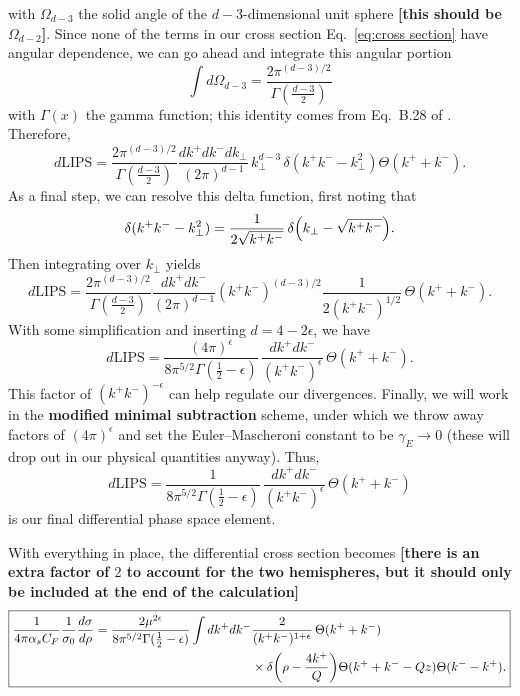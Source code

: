 \documentclass[11pt,twoside,reqno]{amsart}
\theoremstyle{plain}
\theoremstyle{remark}
\theoremstyle{definition}
\theoremstyle{remark}
\theoremstyle{definition}
\theoremstyle{definition}
\newcommand{\LIPS}{\mathrm{LIPS}}
\begin{document}
	with $\Omega_{d - 3}$ the solid angle of the $d - 3$-dimensional unit sphere {\color{red}\textbf{[this should be $\Omega_{d-2}$]}}. Since none of the terms in our cross section Eq.\ \ref{eq:cross section} have angular dependence, we can go ahead and integrate this angular portion
	\begin{equation}
		\int d\Omega_{d - 3} = \frac{2\pi^{(d - 3)/2}}{\Gamma(\frac{d - 3}{2})}
	\end{equation}
	with $\Gamma(x)$ the gamma function; this identity comes from Eq.\ B.28 of \cite{schwartz_quantum_2014}. Therefore,
	\begin{equation}
		d\LIPS = \frac{2\pi^{(d - 3)/2}}{\Gamma(\frac{d - 3}{2})} \frac{dk^+ dk^- dk_\perp}{(2 \pi)^{d - 1}}\,k_\perp^{d - 3}\, \delta(k^+ k^- - k_\perp^2) \Theta(k^+ + k^-).
	\end{equation}
	As a final step, we can resolve this delta function, first noting that
	\begin{equation}
		\delta(k^+ k^- - k_\perp^2) = \frac{1}{2\sqrt{k^+ k^-}}\,\delta\qty(k_\perp - \sqrt{k^+ k^-}).
	\end{equation}
	Then integrating over $k_\perp$ yields
	\begin{equation}
		d\LIPS = \frac{2\pi^{(d - 3)/2}}{\Gamma(\frac{d - 3}{2})} \frac{dk^+ dk^-}{(2 \pi)^{d - 1}} (k^+ k^-)^{(d - 3)/2}\frac{1}{2(k^+ k^-)^{1/2}}\,\Theta(k^+ + k^-).
	\end{equation}
	With some simplification and inserting $d = 4 - 2\epsilon$, we have
	\begin{equation}
		d\LIPS = \frac{(4\pi)^\epsilon}{8\pi^{5/2}\Gamma(\frac{1}{2} - \epsilon)}\,\frac{dk^+ dk^-}{(k^+ k^-)^\epsilon} \, \Theta(k^+ + k^-).
	\end{equation}
	This factor of $(k^+ k^-)^{-\epsilon}$ can help regulate our divergences. Finally, we will work in the \textbf{modified minimal subtraction} scheme, under which we throw away factors of $(4\pi)^\epsilon$ and set the Euler–Mascheroni constant to be $\gamma_E \to 0$ (these will drop out in our physical quantities anyway). Thus,
	\begin{equation}
		d\LIPS = \frac{1}{8\pi^{5/2}\Gamma(\frac{1}{2} - \epsilon)}\,\frac{dk^+ dk^-}{(k^+ k^-)^\epsilon} \, \Theta(k^+ + k^-)
	\end{equation}
	is our final differential phase space element.

	With everything in place, the differential cross section becomes {\color{red}\textbf{[there is an extra factor of $2$ to account for the two hemispheres, but it should only be included at the end of the calculation]}}
	\begin{equation}
	\boxed{
	\begin{aligned}
		\frac{1}{4\pi \alpha_s C_F}\frac{1}{\sigma_0} \frac{d\sigma}{d\rho} = \frac{2\mu^{2\epsilon}}{8\pi^{5/2}\Gamma(\frac{1}{2} - \epsilon)} \int dk^+ dk^- & \frac{2}{(k^+ k^-)^{1 + \epsilon}} \, \Theta(k^+ + k^-) \\
			&\times \delta\qty(\rho - \frac{4 k^+}{Q})\Theta(k^+ + k^- - Qz)\Theta(k^- - k^+).
	\end{aligned}
	}
	\end{equation}
\end{document}

